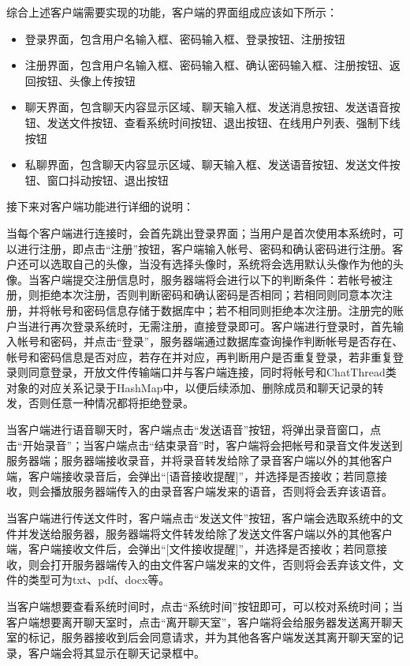 \documentclass[UTF8,12pt]{article}
\begin{document}
综合上述客户端需要实现的功能，客户端的界面组成应该如下所示：

\begin{itemize}
    \item 登录界面，包含用户名输入框、密码输入框、登录按钮、注册按钮
    \item 注册界面，包含用户名输入框、密码输入框、确认密码输入框、注册按钮、返回按钮、头像上传按钮
    \item 聊天界面，包含聊天内容显示区域、聊天输入框、发送消息按钮、发送语音按钮、发送文件按钮、查看系统时间按钮、退出按钮、在线用户列表、强制下线按钮
    \item 私聊界面，包含聊天内容显示区域、聊天输入框、发送语音按钮、发送文件按钮、窗口抖动按钮、退出按钮
\end{itemize}

接下来对客户端功能进行详细的说明：

当每个客户端进行连接时，会首先跳出登录界面；当用户是首次使用本系统时，可以进行注册，即点击“注册”按钮，客户端输入帐号、密码和确认密码进行注册。客户还可以选取自己的头像，当没有选择头像时，系统将会选用默认头像作为他的头像。当客户端提交注册信息时，服务器端将会进行以下的判断条件：若帐号被注册，则拒绝本次注册，否则判断密码和确认密码是否相同；若相同则同意本次注册，并将帐号和密码信息存储于数据库中；若不相同则拒绝本次注册。注册完的账户当进行再次登录系统时，无需注册，直接登录即可。客户端进行登录时，首先输入帐号和密码，并点击“登录”，服务器端通过数据库查询操作判断帐号是否存在、帐号和密码信息是否对应，若存在并对应，再判断用户是否重复登录，若非重复登录则同意登录，开放文件传输端口并与客户端连接，同时将帐号和ChatThread类对象的对应关系记录于HashMap中，以便后续添加、删除成员和聊天记录的转发，否则任意一种情况都将拒绝登录。

当客户端进行语音聊天时，客户端点击“发送语音”按钮，将弹出录音窗口，点击“开始录音”；当客户端点击“结束录音”时，客户端将会把帐号和录音文件发送到服务器端；服务器端接收录音，并将录音转发给除了录音客户端以外的其他客户端，客户端接收录音后，会弹出“[语音接收提醒]”，并选择是否接收；若同意接收，则会播放服务器端传入的由录音客户端发来的语音，否则将会丢弃该语音。

当客户端进行传送文件时，客户端点击“发送文件”按钮，客户端会选取系统中的文件并发送给服务器，服务器端将文件转发给除了发送文件客户端以外的其他客户端，客户端接收文件后，会弹出“[文件接收提醒]”，并选择是否接收；若同意接收，则会打开服务器端传入的由文件客户端发来的文件，否则将会丢弃该文件，文件的类型可为txt、pdf、docx等。

当客户端想要查看系统时间时，点击“系统时间”按钮即可，可以校对系统时间；当客户端想要离开聊天室时，点击“离开聊天室”，客户端将会给服务器发送离开聊天室的标记，服务器接收到后会同意请求，并为其他各客户端发送其离开聊天室的记录，客户端会将其显示在聊天记录框中。
\end{document}
